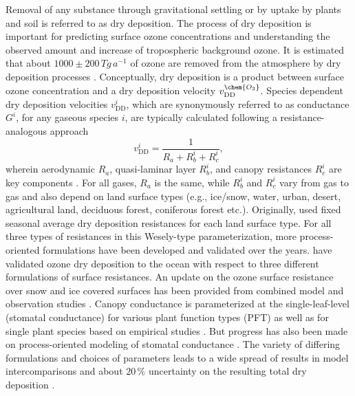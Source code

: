 \documentclass[gmd, manuscript]{copernicus}
\begin{document}
Removal of any substance through gravitational settling or by uptake by plants and soil is referred to as dry deposition. The process of dry deposition is important for predicting surface ozone concentrations and understanding the observed amount and increase of tropospheric background ozone. It is estimated that about $1000 \pm 200\,\unit{Tg\,a^{-1}}$ of ozone are removed from the atmosphere by dry deposition processes \citep{ACP:Monks2015}. Conceptually, dry deposition is a product between surface ozone concentration  and a dry deposition velocity $v^\chem{O_3}_\text{DD}$. Species dependent dry deposition velocities $v^i_\text{DD}$, which are synonymously referred to as conductance $G^i$, for any gaseous species $i$, are typically calculated following a resistance-analogous approach
\begin{equation}
  v^i_\text{DD} = \frac{1}{R_a + R^i_b + R^i_c},
  \label{eq:drydep_velo}
\end{equation}
wherein aerodynamic $R_a$, quasi-laminar layer $R^i_b$, and canopy resistances $R^i_c$ are key components \citep{AE:Wesely1989,ACP:Seinfeld2006}. For all gases, $R_a$ is the same, while $R^i_b$ and $R^i_c$ vary from gas to gas and also depend on land surface types (e.g., ice/snow, water, urban, desert, agricultural land, deciduous forest, coniferous forest etc.). Originally, \citet{AE:Wesely1989} used fixed seasonal average dry deposition resistances for each land surface type. For all three types of resistances in this Wesely-type parameterization, more process-oriented formulations have been developed and validated over the years. \citet{ACP:Luhar2017} have validated ozone dry deposition to the ocean with respect to three different formulations of surface resistances. An update on the ozone surface resistance over snow and ice covered surfaces has been provided from combined model and observation studies \citep[][$v^\chem{O_3}_\text{ice/snow} = 1/10000\,\unit{m\,s^{-1}}$]{ACP:Helmig2007}. Canopy conductance is parameterized at the single-leaf-level (stomatal conductance) for various plant function types (PFT) as well as for single plant species based on empirical studies \citep{PTRS:Jarvis1976, BallBerry1987, ACP:Simpson2012, ICP:MappingManual2017}. But progress has also been made on process-oriented modeling of stomatal conductance \citep{AFM:Anderson2000,PP:Buckley2017}. The variety of differing formulations and choices of parameters leads to a wide spread of results in model intercomparisons \citep{ACP:Hardacre2015,AE:Derwent2018} and about $20\,\unit{\%}$ uncertainty on the resulting total dry deposition \citep{ACP:Monks2015}.\\
\end{document}
